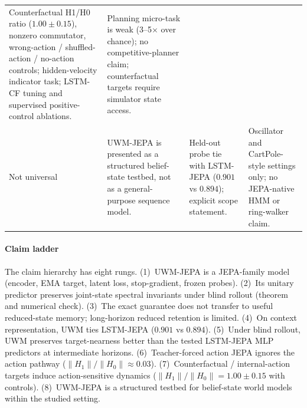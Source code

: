 \begin{table}[t]
\begin{tabular}{p{2.4cm} p{4.2cm} p{4.4cm} p{4.4cm}}
Counterfactual H1/H0 ratio ($1.00 \pm 0.15$), nonzero commutator,
wrong-action / shuffled-action / no-action controls; hidden-velocity
indicator task; LSTM-CF tuning and supervised positive-control
ablations. &
Planning micro-task is weak (3--5$\times$ over chance); no
competitive-planner claim; counterfactual targets require simulator
state access. \\
\addlinespace
Not universal &
UWM-JEPA is presented as a structured belief-state testbed, not as a
general-purpose sequence model. &
Held-out probe tie with LSTM-JEPA ($0.901$ vs $0.894$); explicit scope
statement. &
Oscillator and CartPole-style settings only; no JEPA-native HMM or
ring-walker claim. \\
\bottomrule
\end{tabular}
\end{table}

\paragraph{Claim ladder}
The claim hierarchy has eight rungs. (1)~UWM-JEPA is a JEPA-family
model (encoder, EMA target, latent loss, stop-gradient, frozen
probes). (2)~Its unitary predictor preserves joint-state spectral
invariants under blind rollout (theorem and numerical check). (3)~The
exact guarantee does not transfer to useful reduced-state memory;
long-horizon reduced retention is limited. (4)~On context
representation, UWM ties LSTM-JEPA ($0.901$ vs $0.894$). (5)~Under
blind rollout, UWM preserves target-nearness better than the tested
LSTM-JEPA MLP predictors at intermediate horizons. (6)~Teacher-forced
action JEPA ignores the action pathway
($\|H_1\|/\|H_0\|{\approx}0.03$). (7)~Counterfactual / internal-action
targets induce action-sensitive dynamics
($\|H_1\|/\|H_0\|{=}1.00\pm0.15$ with controls). (8)~UWM-JEPA is a
structured testbed for belief-state world models within the studied
setting.
